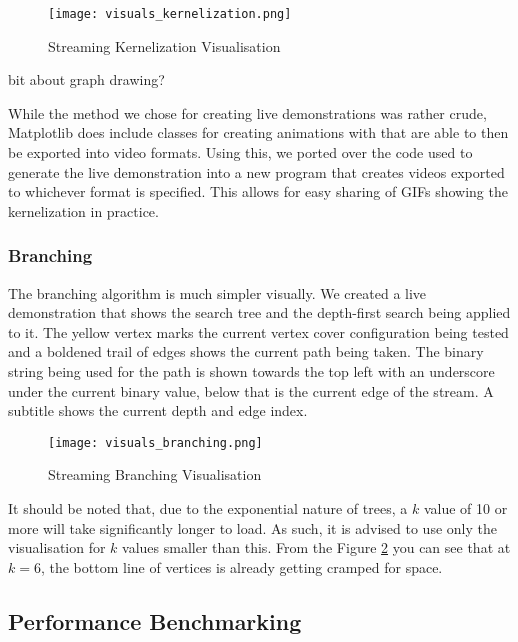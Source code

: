 \begin{figure}[htb]
    \centering
    \texttt{[image: visuals\_kernelization.png]}
    \caption{Streaming Kernelization Visualisation}
    \label{fig:kernelization_visualisation}
\end{figure}

bit about graph drawing?

While the method we chose for creating live demonstrations was rather crude,
Matplotlib does include classes for creating animations with that are able to
then be exported into video formats. Using this, we ported over the code used
to generate the live demonstration into a new program that creates videos
exported to whichever format is specified. This allows for easy sharing of GIFs
showing the kernelization in practice.

\subsubsection{Branching}

The branching algorithm is much simpler visually. We created a live
demonstration that shows the search tree and the depth-first search being
applied to it. The yellow vertex marks the current vertex cover configuration
being tested and a boldened trail of edges shows the current path being taken.
The binary string being used for the path is shown towards the top left with an
underscore under the current binary value, below that is the current edge of
the stream. A subtitle shows the current depth and edge index.

\begin{figure}[htb]
    \centering
    \texttt{[image: visuals\_branching.png]}
    \caption{Streaming Branching Visualisation}
    \label{fig:branching_visualisation}
\end{figure}

It should be noted that, due to the exponential nature of trees, a \(k\) value
of 10 or more will take significantly longer to load. As such, it is advised to
use only the visualisation for \(k\) values smaller than this. From the Figure
\ref{fig:branching_visualisation} you can see that at \(k=6\), the bottom line
of vertices is already getting cramped for space.

\subsection{Performance Benchmarking}

